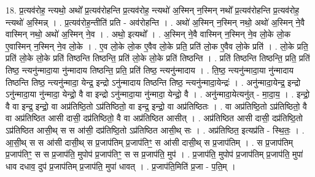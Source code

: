 \documentclass[17pt]{extarticle}
\begin{document}
18. प्र॒त्यव॑रोह॒ न्त्यथो॒ अथो᳚ प्र॒त्यव॑रोहन्ति प्र॒त्यव॑रोह॒ न्त्यथो॑ अ॒स्मिन् न॒स्मिन् नथो᳚ प्र॒त्यव॑रोहन्ति प्र॒त्यव॑रोह॒ न्त्यथो॑ अ॒स्मिन्न् । . प्र॒त्यव॑रोह॒न्तीति॑ प्रति - अव॑रोहन्ति । . अथो॑ अ॒स्मिन् न॒स्मिन् नथो॒ अथो॑ अ॒स्मिन् ने॒वै वास्मिन् नथो॒ अथो॑ अ॒स्मिन् ने॒व । . अथो॒ इत्यथो᳚ । . अ॒स्मिन् ने॒वै वास्मिन् न॒स्मिन् ने॒व लो॒के लो॒क ए॒वास्मिन् न॒स्मिन् ने॒व लो॒के । . ए॒व लो॒के लो॒क ए॒वैव लो॒के प्रति॒ प्रति॑ लो॒क ए॒वैव लो॒के प्रति॑ । . लो॒के प्रति॒ प्रति॑ लो॒के लो॒के प्रति॑ तिष्ठन्ति तिष्ठन्ति॒ प्रति॑ लो॒के लो॒के प्रति॑ तिष्ठन्ति । . प्रति॑ तिष्ठन्ति तिष्ठन्ति॒ प्रति॒ प्रति॑ तिष्ठ॒ न्त्यनु॑न्मादा॒या नु॑न्मादाय तिष्ठन्ति॒ प्रति॒ प्रति॑ तिष्ठ॒ न्त्यनु॑न्मादाय । . ति॒ष्ठ॒ न्त्यनु॑न्मादा॒या नु॑न्मादाय तिष्ठन्ति तिष्ठ॒ न्त्यनु॑न्मादा॒ येन्द्र॒ इन्द्रो ऽनु॑न्मादाय तिष्ठन्ति तिष्ठ॒ न्त्यनु॑न्मादा॒येन्द्रः॑ । . अनु॑न्मादा॒येन्द्र॒ इन्द्रो ऽनु॑न्मादा॒या नु॑न्मादा॒ येन्द्रो॒ वै वा इन्द्रो ऽनु॑न्मादा॒या नु॑न्मादा॒ येन्द्रो॒ वै । . अनु॑न्मादा॒येत्यनु॑त् - मा॒दा॒य॒ । . इन्द्रो॒ वै वा इन्द्र॒ इन्द्रो॒ वा अप्र॑तिष्ठि॒तो ऽप्र॑तिष्ठितो॒ वा इन्द्र॒ इन्द्रो॒ वा अप्र॑तिष्ठितः । . वा अप्र॑तिष्ठि॒तो ऽप्र॑तिष्ठितो॒ वै वा अप्र॑तिष्ठित आसी दासी॒ दप्र॑तिष्ठितो॒ वै वा अप्र॑तिष्ठित आसीत् । . अप्र॑तिष्ठित आसी दासी॒ दप्र॑तिष्ठि॒तो ऽप्र॑तिष्ठित आसी॒थ् स स आ॑सी॒ दप्र॑तिष्ठि॒तो ऽप्र॑तिष्ठित आसी॒थ् सः । . अप्र॑तिष्ठित॒ इत्यप्र॑ति - स्थि॒तः॒ । . आ॒सी॒थ् स स आ॑सी दासी॒थ् स प्र॒जाप॑तिम् प्र॒जाप॑तिꣳ॒॒ स आ॑सी दासी॒थ् स प्र॒जाप॑तिम् । . स प्र॒जाप॑तिम् प्र॒जाप॑तिꣳ॒॒ स स प्र॒जाप॑ति॒ मुपोप॑ प्र॒जाप॑तिꣳ॒॒ स स प्र॒जाप॑ति॒ मुप॑ । . प्र॒जाप॑ति॒ मुपोप॑ प्र॒जाप॑तिम् प्र॒जाप॑ति॒ मुपा॑ धाव दधाव॒ दुप॑ प्र॒जाप॑तिम् प्र॒जाप॑ति॒ मुपा॑ धावत् । . प्र॒जाप॑ति॒मिति॑ प्र॒जा - प॒ति॒म् । \newline
\end{document}
